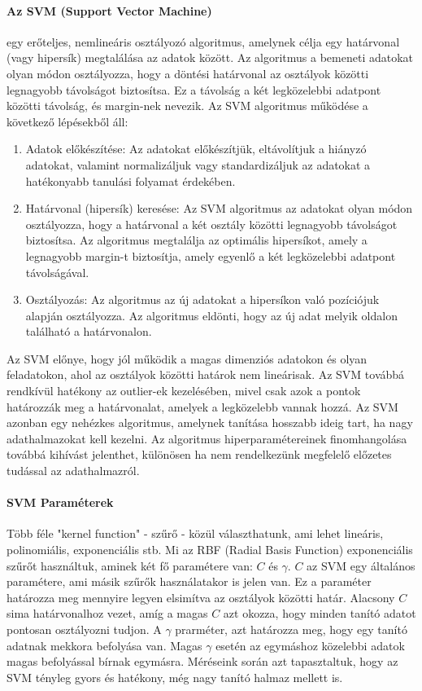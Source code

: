 \documentclass[acmtog, authorversion]{acmart}
\begin{document}
\paragraph{Az SVM (Support Vector Machine)} egy erőteljes, nemlineáris osztályozó algoritmus, amelynek célja egy határvonal (vagy hipersík) megtalálása az adatok között. Az algoritmus a bemeneti adatokat olyan módon osztályozza, hogy a döntési határvonal az osztályok közötti legnagyobb távolságot biztosítsa. Ez a távolság a két legközelebbi adatpont közötti távolság, és margin-nek nevezik.
Az SVM algoritmus működése a következő lépésekből áll:
\begin{enumerate}
    \item Adatok előkészítése: Az adatokat előkészítjük, eltávolítjuk a hiányzó adatokat, valamint normalizáljuk vagy standardizáljuk az adatokat a hatékonyabb tanulási folyamat érdekében.
    \item Határvonal (hipersík) keresése: Az SVM algoritmus az adatokat olyan módon osztályozza, hogy a határvonal a két osztály közötti legnagyobb távolságot biztosítsa. Az algoritmus megtalálja az optimális hipersíkot, amely a legnagyobb margin-t biztosítja, amely egyenlő a két legközelebbi adatpont távolságával.
    \item Osztályozás: Az algoritmus az új adatokat a hipersíkon való pozíciójuk alapján osztályozza. Az algoritmus eldönti, hogy az új adat melyik oldalon található a határvonalon.
\end{enumerate}
Az SVM előnye, hogy jól működik a magas dimenziós adatokon és olyan feladatokon, ahol az osztályok közötti határok nem lineárisak. Az SVM továbbá rendkívül hatékony az outlier-ek kezelésében, mivel csak azok a pontok határozzák meg a határvonalat, amelyek a legközelebb vannak hozzá. Az SVM azonban egy nehézkes algoritmus, amelynek tanítása hosszabb ideig tart, ha nagy adathalmazokat kell kezelni. Az algoritmus hiperparamétereinek finomhangolása továbbá kihívást jelenthet, különösen ha nem rendelkezünk megfelelő előzetes tudással az adathalmazról.
\paragraph{SVM Paraméterek} Több féle "kernel function" - szűrő - közül választhatunk, ami lehet lineáris, polinomiális, exponenciális stb. Mi az RBF (Radial Basis Function) exponenciális szűrőt használtuk, aminek két fő paramétere van: $C$ és $\gamma$. $C$ az SVM egy általános paramétere, ami másik szűrők használatakor is jelen van. Ez a paraméter határozza meg mennyire legyen elsimítva az osztályok közötti határ. Alacsony $C$ sima határvonalhoz vezet, amíg a magas $C$ azt okozza, hogy minden tanító adatot pontosan osztályozni tudjon. A $\gamma$ prarméter, azt határozza meg, hogy egy tanító adatnak mekkora befolyása van. Magas $\gamma$ esetén az egymáshoz közelebbi adatok magas befolyással bírnak egymásra. Méréseink során azt tapasztaltuk, hogy az SVM tényleg gyors és hatékony, még nagy tanító halmaz mellett is.
\end{document}
